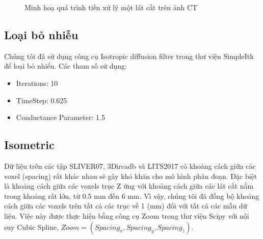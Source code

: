 \begin{figure}
  \centering
  \caption{Minh hoạ quá trình tiền xử lý một lát cắt trên ảnh CT}
  \label{fig:ab}
\end{figure}

\subsection{Loại bỏ nhiễu}
Chúng tôi đã sử dụng công cụ Isotropic diffusion filter trong thư viện SimpleItk để loại bỏ nhiểu. Các tham số sử dụng:
\begin{itemize}
    \item Iterations: 10
    \item TimeStep: 0.625
    \item Conductance Parameter: 1.5
\end{itemize}
\subsection{Isometric}
Dữ liệu trên các tập SLIVER07, 3Dircadb và LITS2017 có khoảng cách giữa các voxel (spacing) rất khác nhau sẽ gây khó khăn cho mô hình phân đoạn. Đặc biệt là khoảng cách giữa các voxels trục Z ứng với khoảng cách giữa các lát cắt nằm trong khoảng rất lớn, từ 0.5 mm đến 6 mm. Vì vậy, chúng tôi đã đồng bộ khoảng cách giữa các voxels trên tất cả các trục về 1 (mm) đối với tất cả các mẫu dữ liệu. Việc này được thực hiện bằng công cụ Zoom trong thư viện Scipy với nội suy Cubic Spline, $Zoom = (Spacing_x, Spacing_y, Spacing_z)$.

